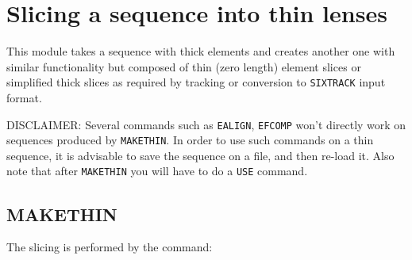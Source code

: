  
\chapter{Slicing a sequence into thin lenses}
\label{chap:makethin}

This module takes a sequence with thick elements and creates another one 
with similar functionality but composed of
thin (zero length) element slices or simplified thick slices as required
by \madx tracking or conversion to \texttt{SIXTRACK} input format.

DISCLAIMER: Several \madx commands such as {\texttt{EALIGN}},
{\texttt{EFCOMP}} won't directly work on sequences produced by
{\texttt{MAKETHIN}}.
In order to use such commands on a thin sequence, it is advisable to
save the sequence on a file, and then re-load it. Also note that after
\texttt{MAKETHIN} you will have to do a \texttt{USE} command.   

\section{MAKETHIN}
\label{sec:makethin}

The slicing is performed by the command: 

